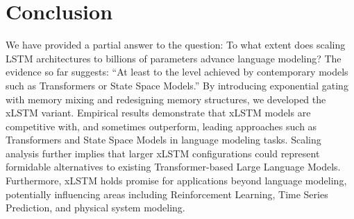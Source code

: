 \section{Conclusion}
We have provided a partial answer to the question: To what extent does scaling LSTM architectures to billions of parameters advance language modeling? The evidence so far suggests: ``At least to the level achieved by contemporary models such as Transformers or State Space Models.'' By introducing exponential gating with memory mixing and redesigning memory structures, we developed the xLSTM variant. Empirical results demonstrate that xLSTM models are competitive with, and sometimes outperform, leading approaches such as Transformers and State Space Models in language modeling tasks. Scaling analysis further implies that larger xLSTM configurations could represent formidable alternatives to existing Transformer-based Large Language Models. Furthermore, xLSTM holds promise for applications beyond language modeling, potentially influencing areas including Reinforcement Learning, Time Series Prediction, and physical system modeling.

